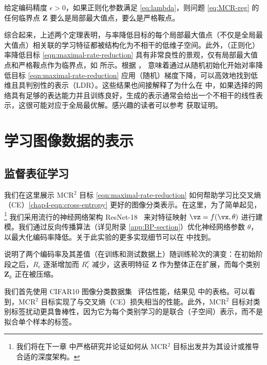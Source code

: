 \documentclass[../../book-main_zh.tex]{subfiles}
\begin{document}
\begin{theorem}[\bf 良性全局优化景观]\label{thm:mcr-benign-opt-landscape}
    给定编码精度 $\epsilon > 0$，如果正则化参数满足 \eqref{eq:lambda}，则问题 \eqref{eq:MCR-reg} 的任何临界点 $\bm Z$ 要么是局部最大值点，要么是严格鞍点。
\end{theorem}
综合起来，上述两个定理表明，与率降低目标的每个局部最大值点（不仅是全局最大值点）相关联的学习特征都被结构化为不相干的低维子空间。此外，（正则化）率降低目标 \eqref{eqn:maximal-rate-reduction} 具有非常良性的景观，仅有局部最大值点和严格鞍点作为临界点，如  所示。根据 \cite{sun2015nonconvex,lee2016gradient}， 意味着通过从随机初始化开始对率降低目标 \eqref{eqn:maximal-rate-reduction} 应用（随机）梯度下降，可以高效地找到低维且具判别性的表示（LDR）。这些结果也间接解释了为什么在  中，如果选择的网络具有足够的表达能力并且训练良好，生成的表示通常会给出一个不相干的线性表示，这很可能对应于全局最优解。感兴趣的读者可以参考 \cite{wang2024global} 获取证明。

\section{学习图像数据的表示}
\label{sec:representations-image}
\subsection{监督表征学习}
\label{sec:MCR2-classification}
\label{eg:Rate-Reduction-CIFAR10}

我们在这里展示 MCR$^2$ 目标 \eqref{eqn:maximal-rate-reduction} 如何帮助学习比交叉熵（CE）\eqref{chap4-eqn:cross-entropy} 更好的图像分类表示。在这里，为了简单起见，\footnote{我们将在下一章  中严格研究并论证如何从 MCR$^2$ 目标出发并为其设计或推导合适的深度架构。} 我们采用流行的神经网络架构 ResNet-18~\cite{he2016deep} 来对特征映射 $\vz = f(\vx,\theta)$ 进行建模。我们通过反向传播算法（详见附录 \ref{app:BP-section}）优化神经网络参数 $\theta$，以最大化编码率降低。关于此实验的更多实现细节可以在 \cite{chan2021redunet} 中找到。

 说明了两个编码率及其差值（在训练和测试数据上）随训练轮次的演变：在初始阶段之后，$R_\epsilon$ 逐渐增加而 $R^c_\epsilon$ 减少，这表明特征 $\bm Z$ 作为整体正在扩展，而每个类别 $\bm Z_k$ 正在被压缩。

我们首先使用 CIFAR10 图像分类数据集~\cite{krizhevsky2009learning} 评估性能，结果见  中的表格。可以看到，MCR$^2$ 目标实现了与交叉熵（CE）损失相当的性能。此外，MCR$^2$ 目标对类别标签扰动更具鲁棒性，因为它为每个类别学习的是联合（子空间）表示，而不是拟合单个样本的标签。
\end{document}
